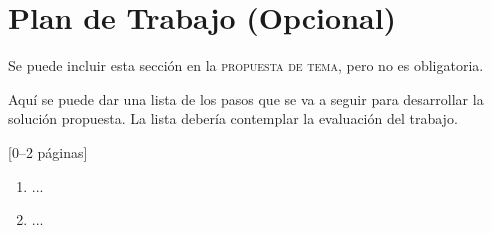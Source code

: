 \documentclass[guia]{upropuesta}
\begin{document}
\section{Plan de Trabajo (Opcional)}\label{sec:pdt}

\begin{pauta}
Se puede incluir esta sección en la \textsc{propuesta de tema}, pero no es obligatoria.

Aquí se puede dar una lista de los pasos que se va a seguir para desarrollar la solución propuesta. La lista debería contemplar la evaluación del trabajo.

[0--2 páginas]
\end{pauta}

\begin{enumerate}
  \item ...
  \item ...
\end{enumerate}



\end{document}
